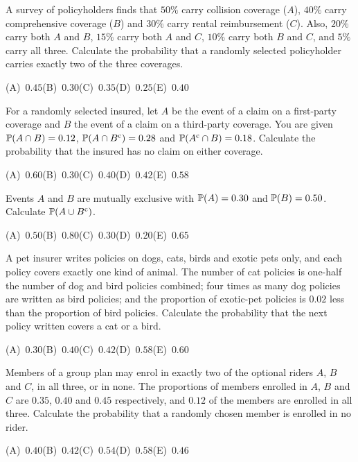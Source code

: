 \begin{practice}
A survey of policyholders finds that $50\%$ carry collision coverage ($A$), $40\%$ carry
comprehensive coverage ($B$) and $30\%$ carry rental reimbursement ($C$). Also,
$20\%$ carry both $A$ and $B$, $15\%$ carry both $A$ and $C$, $10\%$ carry both $B$ and $C$,
and $5\%$ carry all three. Calculate the probability that a randomly selected policyholder
carries exactly two of the three coverages.

\smallskip\noindent (A)~$0.45$\hfill (B)~$0.30$\hfill (C)~$0.35$\hfill (D)~$0.25$\hfill (E)~$0.40$\hfill\mbox{}
\end{practice}

\begin{practice}
For a randomly selected insured, let $A$ be the event of a claim on a first-party coverage
and $B$ the event of a claim on a third-party coverage. You are given
$\mathbb{P}(A \cap B) = 0.12$, $\mathbb{P}(A \cap B^{\mathrm{c}}) = 0.28$ and $\mathbb{P}(A^{\mathrm{c}} \cap B) = 0.18$.
Calculate the probability that the insured has no claim on either coverage.

\smallskip\noindent (A)~$0.60$\hfill (B)~$0.30$\hfill (C)~$0.40$\hfill (D)~$0.42$\hfill (E)~$0.58$\hfill\mbox{}
\end{practice}

\begin{practice}
Events $A$ and $B$ are mutually exclusive with $\mathbb{P}(A) = 0.30$ and $\mathbb{P}(B) = 0.50$.
Calculate $\mathbb{P}(A \cup B^{\mathrm{c}})$.

\smallskip\noindent (A)~$0.50$\hfill (B)~$0.80$\hfill (C)~$0.30$\hfill (D)~$0.20$\hfill (E)~$0.65$\hfill\mbox{}
\end{practice}

\begin{practice}
A pet insurer writes policies on dogs, cats, birds and exotic pets only, and each policy
covers exactly one kind of animal. The number of cat policies is one-half the number of dog
and bird policies combined; four times as many dog policies are written as bird policies;
and the proportion of exotic-pet policies is $0.02$ less than the proportion of bird
policies. Calculate the probability that the next policy written covers a cat or a bird.

\smallskip\noindent (A)~$0.30$\hfill (B)~$0.40$\hfill (C)~$0.42$\hfill (D)~$0.58$\hfill (E)~$0.60$\hfill\mbox{}
\end{practice}

\begin{practice}
Members of a group plan may enrol in exactly two of the optional riders $A$, $B$ and $C$, in
all three, or in none. The proportions of members enrolled in $A$, $B$ and $C$ are $0.35$,
$0.40$ and $0.45$ respectively, and $0.12$ of the members are enrolled in all three.
Calculate the probability that a randomly chosen member is enrolled in no rider.

\smallskip\noindent (A)~$0.40$\hfill (B)~$0.42$\hfill (C)~$0.54$\hfill (D)~$0.58$\hfill (E)~$0.46$\hfill\mbox{}
\end{practice}

